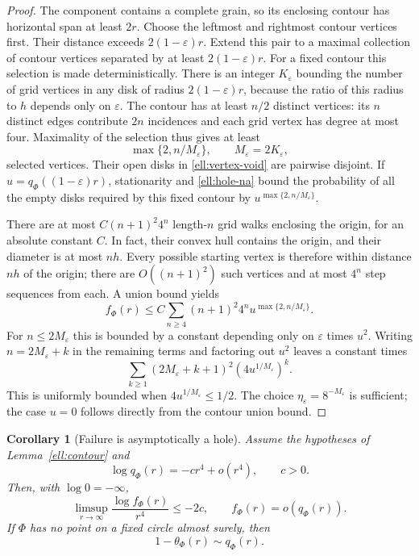 \documentclass[11pt,a4paper]{article}
\newtheorem{corollary}[theorem]{Corollary}
\theoremstyle{definition}
\theoremstyle{remark}
\numberwithin{equation}{section}
\begin{document}
\begin{proof}
The component contains a complete grain, so its enclosing contour
has horizontal span at least $2r$.  Choose the leftmost and rightmost
contour vertices first.  Their distance exceeds
$2(1-\varepsilon)r$.  Extend this pair to a maximal collection of
contour vertices separated by at least $2(1-\varepsilon)r$.
For a fixed contour this selection is made deterministically.
There is an integer $K_\varepsilon$ bounding the number of grid
vertices in any disk of radius $2(1-\varepsilon)r$, because the
ratio of this radius to $h$ depends only on $\varepsilon$.
The contour has at least $n/2$ distinct vertices: its $n$ distinct
edges contribute $2n$ incidences and each grid vertex has degree
at most four.  Maximality of the selection thus gives at least
\[
 \max\{2,n/M_\varepsilon\},\qquad M_\varepsilon=2K_\varepsilon,
\]
selected vertices.  Their open disks in \eqref{ell:vertex-void}
are pairwise disjoint.  If $u=q_\Phi((1-\varepsilon)r)$,
stationarity and \eqref{ell:hole-na} bound the probability of all
the empty disks required by this fixed contour by
$u^{\max\{2,n/M_\varepsilon\}}$.

There are at most $C(n+1)^2 4^n$ length-$n$ grid walks enclosing
the origin, for an absolute constant $C$.  In fact, their convex
hull contains the origin, and their diameter is at most $nh$.
Every possible starting vertex is therefore within distance $nh$
of the origin; there are $O((n+1)^2)$ such vertices and at most
$4^n$ step sequences from each.  A union bound yields
\begin{equation}\label{ell:contour-series}
 f_\Phi(r)\le C\sum_{n\ge4}(n+1)^2 4^n
                  u^{\max\{2,n/M_\varepsilon\}}.
\end{equation}
For $n\le2M_\varepsilon$ this is bounded by a constant depending
only on $\varepsilon$ times $u^2$.  Writing
$n=2M_\varepsilon+k$ in the remaining terms and factoring out
$u^2$ leaves a constant times
\[
 \sum_{k\ge1}(2M_\varepsilon+k+1)^2
                   (4u^{1/M_\varepsilon})^k.
\]
This is uniformly bounded when
$4u^{1/M_\varepsilon}\le1/2$.
The choice $\eta_\varepsilon=8^{-M_\varepsilon}$ is sufficient;
the case $u=0$ follows directly from the contour union bound.
\end{proof}

\begin{corollary}[Failure is asymptotically a hole]\label{ell:hole-failure}
Assume the hypotheses of Lemma~\ref{ell:contour} and
\begin{equation}\label{ell:quartic-hole}
 \log q_\Phi(r)=-c r^4+o(r^4),\qquad c>0.
\end{equation}
Then, with $\log0=-\infty$,
\[
 \limsup_{r\to\infty}\frac{\log f_\Phi(r)}{r^4}\le-2c,
 \qquad f_\Phi(r)=o(q_\Phi(r)).
\]
If $\Phi$ has no point on a fixed circle almost surely, then
\begin{equation}\label{ell:failure-equivalence}
 1-\theta_\Phi(r)\sim q_\Phi(r).
\end{equation}
\end{corollary}
\end{document}
